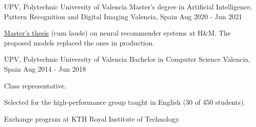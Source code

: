 

\begin{cventries}

  \cventry
    {UPV, Polytechnic University of Valencia} %
    {Master’s degree in Artificial Intelligence, Pattern
Recognition and Digital Imaging} %
    {Valencia, Spain} %
    {Aug 2020 - Jun 2021}
    {
      \begin{cvitems} %
        \item {\href{https://github.com/jiwidi/MASTER_THESIS/blob/master/thesis.pdf}{Master's thesis} (cum laude) on neural recommender systems at H\&M. The proposed models replaced the ones in production.}
      \end{cvitems}
    }
    
  \cventry
    {UPV, Polytechnic University of Valencia} %
    {Bachelor in Computer Science} %
    {Valencia, Spain} %
    {Aug 2014 - Jun 2018}
    {
      \begin{cvitems} %
        \item {Class representative.}
        \item {Selected for the high-performance group taught in English (30 of 450 students).}
        \item {Exchange program at KTH Royal Institute of Technology.}
      \end{cvitems}
    }
\end{cventries}
